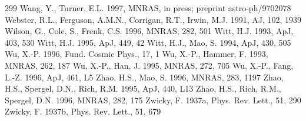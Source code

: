 \documentclass[a4paper,10pt]{article} %
\begin{document}
\begin{thebibliography}{299}
  Wang, Y., Turner, E.L. 1997, MNRAS, in press; preprint
  astro-ph/9702078
  Webster, R.L., Ferguson, A.M.N., Corrigan, R.T., Irwin, M.J. 1991,
  AJ, 102, 1939
  Wilson, G., Cole, S., Frenk, C.S. 1996, MNRAS, 282, 501
  Witt, H.J. 1993, ApJ, 403, 530
  Witt, H.J. 1995, ApJ, 449, 42
  Witt, H.J., Mao, S. 1994, ApJ, 430, 505
  Wu, X.-P. 1996, Fund. Cosmic Phys., 17, 1
  Wu, X.-P., Hammer, F. 1993, MNRAS, 262, 187
  Wu, X.-P., Han, J. 1995, MNRAS, 272, 705
  Wu, X.-P., Fang, L.-Z. 1996, ApJ, 461, L5
  Zhao, H.S., Mao, S. 1996, MNRAS, 283, 1197
  Zhao, H.S., Spergel, D.N., Rich, R.M. 1995, ApJ, 440, L13
  Zhao, H.S., Rich, R.M., Spergel, D.N. 1996, MNRAS, 282, 175
  Zwicky, F. 1937a, Phys. Rev. Lett., 51, 290
  Zwicky, F. 1937b, Phys. Rev. Lett., 51, 679

\end{thebibliography} %
\end{document}

